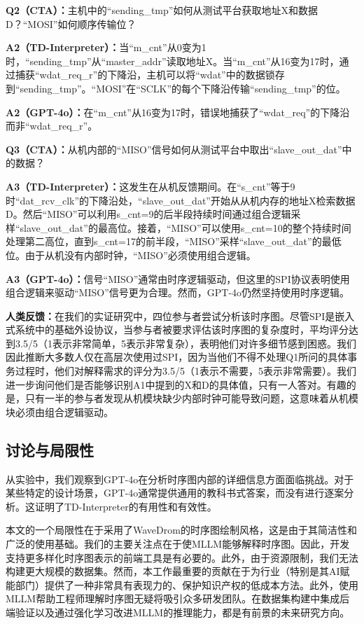 \textbf{Q2（CTA）：}主机中的“sending\_tmp”如何从测试平台获取地址X和数据D？“MOSI”如何顺序传输位？

\textbf{A2（TD-Interpreter）：}当“m\_cnt”从0变为1时，“sending\_tmp”从“master\_addr”读取地址X。当“m\_cnt”从16变为17时，通过捕获“wdat\_req\_r”的下降沿，主机可以将“wdat”中的数据锁存到“sending\_tmp”。“MOSI”在“SCLK”的每个下降沿传输“sending\_tmp”的位。

\textbf{A2（GPT-4o）：}在“m\_cnt”从16变为17时，错误地捕获了“wdat\_req”的下降沿而非“wdat\_req\_r”。

\textbf{Q3（CTA）：}从机内部的“MISO”信号如何从测试平台中取出“slave\_out\_dat”中的数据？

\textbf{A3（TD-Interpreter）：}这发生在从机反馈期间。在“s\_cnt”等于9时“dat\_rcv\_clk”的下降沿处，“slave\_out\_dat”开始从从机内存的地址X检索数据D。然后“MISO”可以利用s\_cnt=9的后半段持续时间通过组合逻辑采样“slave\_out\_dat”的最高位。接着，“MISO”可以使用s\_cnt=10的整个持续时间处理第二高位，直到s\_cnt=17的前半段，“MISO”采样“slave\_out\_dat”的最低位。由于从机没有内部时钟，“MISO”必须使用组合逻辑。

\textbf{A3（GPT-4o）：}信号“MISO”通常由时序逻辑驱动，但这里的SPI协议表明使用组合逻辑来驱动“MISO”信号更为合理。然而，GPT-4o仍然坚持使用时序逻辑。

\textbf{人类反馈：}在我们的实证研究中，四位参与者尝试分析该时序图。尽管SPI是嵌入式系统中的基础外设协议，当参与者被要求评估该时序图的复杂度时，平均评分达到3.5/5（1表示非常简单，5表示非常复杂），表明他们对许多细节感到困惑。我们因此推断大多数人仅在高层次使用过SPI，因为当他们不得不处理Q1所问的具体事务过程时，他们对解释需求的评分为3.5/5（1表示不需要，5表示非常需要）。我们进一步询问他们是否能够识别A1中提到的X和D的具体值，只有一人答对。有趣的是，只有一半的参与者发现从机模块缺少内部时钟可能导致问题，这意味着从机模块必须由组合逻辑驱动。

\subsection{讨论与局限性}

从实验中，我们观察到GPT-4o在分析时序图内部的详细信息方面面临挑战。对于某些特定的设计场景，GPT-4o通常提供通用的教科书式答案，而没有进行逐案分析。这证明了TD-Interpreter的有用性和有效性。

本文的一个局限性在于采用了WaveDrom的时序图绘制风格，这是由于其简洁性和广泛的使用基础。我们的主要关注点在于使MLLM能够解释时序图。因此，开发支持更多样化时序图表示的前端工具是有必要的。此外，由于资源限制，我们无法构建更大规模的数据集。然而，本工作最重要的贡献在于为行业（特别是其AI赋能部门）提供了一种非常具有表现力的、保护知识产权的低成本方法。此外，使用MLLM帮助工程师理解时序图无疑将吸引众多研发团队。在数据集构建中集成后端验证以及通过强化学习改进MLLM的推理能力，都是有前景的未来研究方向。



